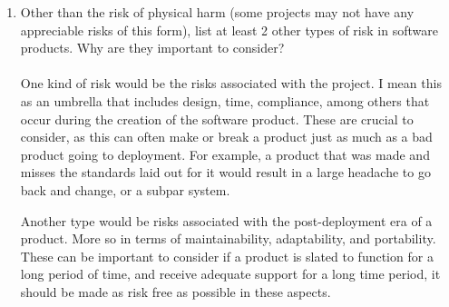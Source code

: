 \documentclass{article}
\begin{document}
\begin{enumerate}
  \item Other than the risk of physical harm (some projects may not have any
  appreciable risks of this form), list at least 2 other types of risk in
  software products. Why are they important to consider?\\\\
  One kind of risk would be the risks associated with the project. I mean this as an umbrella that includes design, time, compliance, among others that occur during the creation of the software product. These are crucial to consider, as this can often make or break a product just as much as a bad product going to deployment. For example, a product that was made and misses the standards laid out for it would result in a large headache to go back and change, or a subpar system.

Another type would be risks associated with the post-deployment era of a product. More so in terms of maintainability, adaptability, and portability. These can be important to consider if a product is slated to function for a long period of time, and receive adequate support for a long time period, it should be made as risk free as possible in these aspects.


\end{enumerate}
\end{document}
